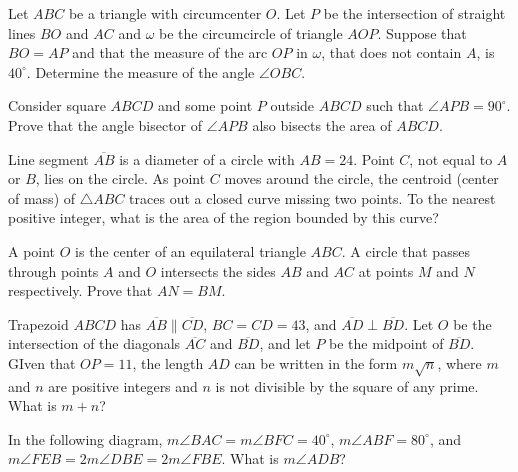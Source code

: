 \documentclass{article}
\begin{document}
\begin{req}[Brazil 2007]{4}
Let $ABC$ be a triangle with circumcenter $O$. Let $P$ be the intersection of straight lines $BO$ and $AC$ and $\omega$ be the circumcircle of triangle $AOP$. Suppose that $BO = AP$ and that the measure of the arc $OP$ in $\omega$, that does not contain $A$, is $40^{\circ}$. Determine the measure of the angle $\angle OBC$.
\end{req}

\begin{prob}[]{4}
Consider square $ABCD$ and some point $P$ outside $ABCD$ such that $\angle APB=90^{\circ}.$ Prove that the angle bisector of $\angle APB$ also bisects the area of $ABCD.$
\end{prob}
 
\begin{req}[AMC 10B 2018/12]{4}
Line segment $\overline{AB}$ is a diameter of a circle with $AB=24$. Point $C$, not equal to $A$ or $B$, lies on the circle. As point $C$ moves around the circle, the centroid (center of mass) of $\triangle{ABC}$ traces out a closed curve missing two points. To the nearest positive integer, what is the area of the region bounded by this curve?
\end{req}

\begin{prob}{6}
A point $O$ is the center of an equilateral triangle $ABC.$ A circle that passes through points $A$ and $O$ intersects the sides $AB$ and $AC$ at points $M$ and $N$ respectively. Prove that $AN = BM.$
\end{prob}

\begin{req}[AMC 10A 2021/17]{6}
Trapezoid $ABCD$ has $\overline{AB} \parallel \overline{CD}$, $BC = CD = 43$, and $\overline{AD} \perp \overline{BD}$. Let $O$ be the intersection of the diagonals $\overline{AC}$ and $\overline{BD}$, and let $P$ be the midpoint of $\overline{BD}$. GIven that $OP = 11$, the length $AD$ can be written in the form $m\sqrt{n}$, where $m$ and $n$ are positive integers and $n$ is not divisible by the square of any prime. What is $m + n$?
\end{req}
    
\begin{prob}{6}
In the following diagram, $m\angle BAC=m\angle BFC=40^{\circ}$, $m\angle ABF=80^{\circ}$, and $m\angle FEB=2m\angle DBE=2m\angle FBE$. What is $m\angle ADB$?
\end{prob}
    
\end{document}
